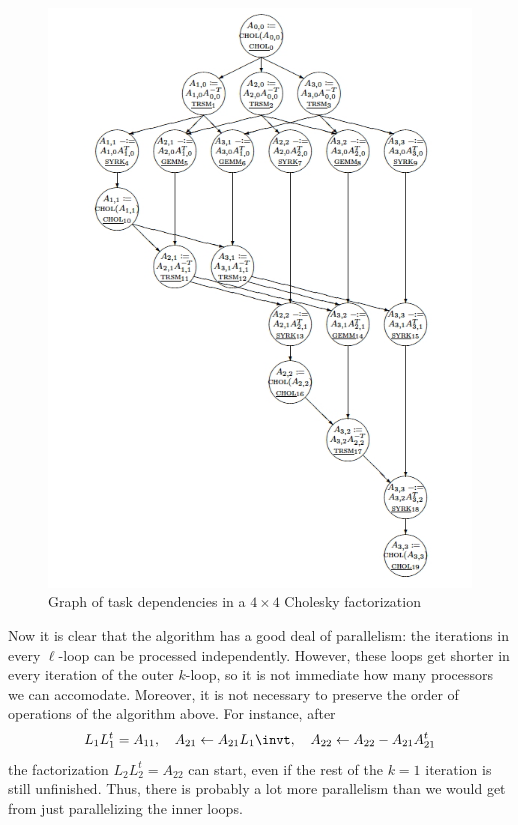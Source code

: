 \begin{figure}[ht]
\includegraphics[scale=.7]{graphics-public/chol4dag}
  \caption{Graph of task dependencies in a $4\times4$ Cholesky
    factorization}
  \label{fig:chol4dag}
\end{figure}

Now it is clear that the algorithm has a good deal of parallelism: the
iterations in every $\ell$-loop can be processed independently.
However, these loops get shorter in every iteration of the outer
$k$-loop, so it is not immediate how many processors we can
accomodate. Moreover, it is not necessary to preserve the order of
operations of the algorithm above. For instance, after
\[
  L_1L_1^t=A_{11},\quad A_{21}\leftarrow A_{21}L_1\invt,\quad
  A_{22}\leftarrow A_{22}-A_{21}A_{21}^t
\]
the factorization $L_2L_2^t=A_{22}$ can start, even if the rest of the
$k=1$ iteration is still unfinished. Thus, there is probably a lot more
parallelism than we would get from just parallelizing the inner loops.

